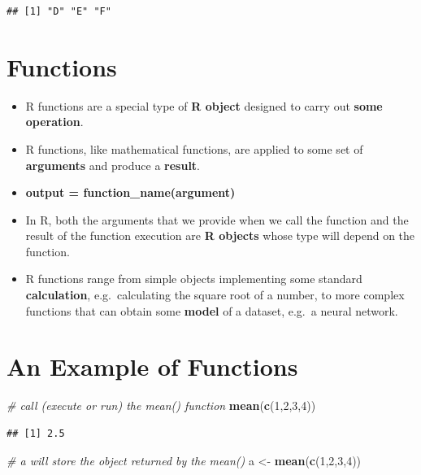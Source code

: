 \documentclass[]{book}
\newenvironment{Shaded}{\begin{snugshade}}{\end{snugshade}}
\newcommand{\KeywordTok}[1]{\textcolor[rgb]{0.13,0.29,0.53}{\textbf{{#1}}}}
\newcommand{\DecValTok}[1]{\textcolor[rgb]{0.00,0.00,0.81}{{#1}}}
\newcommand{\StringTok}[1]{\textcolor[rgb]{0.31,0.60,0.02}{{#1}}}
\newcommand{\CommentTok}[1]{\textcolor[rgb]{0.56,0.35,0.01}{\textit{{#1}}}}
\newcommand{\NormalTok}[1]{{#1}}
\providecommand{\tightlist}{%
  \setlength{\itemsep}{0pt}\setlength{\parskip}{0pt}}
\begin{document}
\begin{verbatim}
## [1] "D" "E" "F"
\end{verbatim}

\section{Functions}\label{functions}

\begin{itemize}
\tightlist
\item
  R functions are a special type of \textbf{R object} designed to carry
  out \textbf{some operation}.
\item
  R functions, like mathematical functions, are applied to some set of
  \textbf{arguments} and produce a \textbf{result}.
\item
  \textbf{output = function\_name(argument)}
\item
  In R, both the arguments that we provide when we call the function and
  the result of the function execution are \textbf{R objects} whose type
  will depend on the function.
\item
  R functions range from simple objects implementing some standard
  \textbf{calculation}, e.g.~calculating the square root of a number, to
  more complex functions that can obtain some \textbf{model} of a
  dataset, e.g.~a neural network.
\end{itemize}

\section{An Example of Functions}\label{an-example-of-functions}

\begin{Shaded}
\begin{Highlighting}[]
\CommentTok{# call (execute or run) the mean() function}
\KeywordTok{mean}\NormalTok{(}\KeywordTok{c}\NormalTok{(}\DecValTok{1}\NormalTok{,}\DecValTok{2}\NormalTok{,}\DecValTok{3}\NormalTok{,}\DecValTok{4}\NormalTok{))    }
\end{Highlighting}
\end{Shaded}

\begin{verbatim}
## [1] 2.5
\end{verbatim}

\begin{Shaded}
\begin{Highlighting}[]
\CommentTok{# a will store the object returned by the mean()}
\NormalTok{a <-}\StringTok{ }\KeywordTok{mean}\NormalTok{(}\KeywordTok{c}\NormalTok{(}\DecValTok{1}\NormalTok{,}\DecValTok{2}\NormalTok{,}\DecValTok{3}\NormalTok{,}\DecValTok{4}\NormalTok{))   }
\end{Highlighting}
\end{Shaded}
\end{document}
